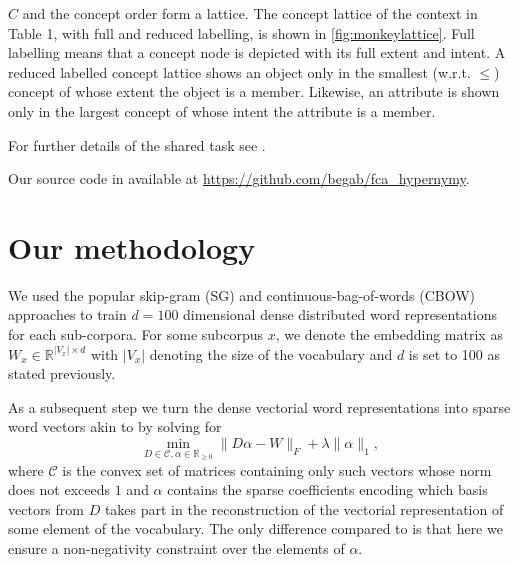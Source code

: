 \documentclass[11pt,a4paper]{article}
\begin{document}
$C$ and the concept order form a %
lattice.  The concept lattice of the context in Table 1, with full and reduced
labelling, is shown in \ref{fig:monkeylattice}.
Full labelling means that a concept node is depicted with its full extent and
intent. A reduced labelled concept lattice shows an object only in the smallest
(w.r.t. $\le$) concept of whose extent the object is a member.
Likewise, an attribute is shown only in the largest concept of whose intent the
attribute is a member.%

For further details of the shared task see \cite{Camacho-Collados:2018}.

Our source code in available at \url{https://github.com/begab/fca_hypernymy}.


\section{Our methodology}
We used the popular skip-gram (SG) and continuous-bag-of-words (CBOW) approaches \cite{Mikolov:2013f} to train $d=100$ dimensional dense distributed word representations for each sub-corpora. For some subcorpus $x$, we denote the embedding matrix as $W_x \in \mathbb{R}^{\lvert V_x \rvert \times d}$ with $\lvert V_x \rvert$ denoting the size of the vocabulary and $d$ is set to 100 as stated previously.

As a subsequent step we turn the dense vectorial word representations into
sparse word vectors akin to \citet{Berend:2017} by solving for
\begin{equation}
\min\limits_{D \in \mathcal{C}, \alpha \in \mathbb{R}_{\geq0}} \lVert D\alpha - W \rVert_F + \lambda \lVert \alpha \rVert_1,
\label{nonneg_SPAMS_objective}
\end{equation}
where $\mathcal{C}$ is the convex set of matrices containing only such vectors
whose norm does not exceeds $1$ and $\alpha$ contains the sparse coefficients
encoding which basis vectors from $D$ takes part in the reconstruction of the
vectorial representation of some element of the vocabulary. The only difference
compared to \cite{Berend:2017} is that here we ensure a non-negativity constraint over the elements of $\alpha$.
\end{document}
